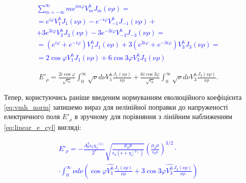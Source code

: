\textcolor{blue} { \begin{equation*} \begin{aligned}
\sum_{m=-\infty}^\infty m e^{im \varphi} V_m^h J_m(\nu \rho) = \\ =
  e^{  i \varphi} V_{ 1}^h J_{ 1}(\nu \rho) - 
  e^{- i \varphi} V_{-1}^h J_{-1}(\nu \rho) + \\ +
3 e^{ 3i \varphi} V_{ 3}^h J_{ 3}(\nu \rho) - 
3 e^{-3i \varphi} V_{-3}^h J_{-3}(\nu \rho) = \\ =
\left( e^{ i\varphi} + e^{- i\varphi} \right) V_1^h J_1(\nu \rho) + 
3 \left( e^{3i\varphi} + e^{-3i\varphi} \right) V_3^h J_3(\nu \rho) = \\
= 2 \cos \varphi V_1^h J_1(\nu \rho) + 
6 \cos 3 \varphi V_3^h J_3(\nu \rho)
\end{aligned} \end{equation*} }

\begin{equation} \begin{aligned}
E'_\rho = \frac{2 i \cos \varphi}{\sqrt{\epsilon_0}}
\int_0^\infty \sqrt{\nu} d \nu V_1^h \frac{J_1(\nu \rho)}{\nu \rho} +
\frac{6 i \cos 3 \varphi}{\sqrt{\epsilon_0}}
\int_0^\infty \sqrt{\nu} d \nu V_3^h \frac{J_3(\nu \rho)}{\nu \rho}.
\end{aligned} \end{equation}

Тепер, користуючись раніше введеним нормуванням еволюційного коефіцієнта 
\eqref{eq:vmh_norm} запишемо вираз для нелінійної поправки до напруженості 
електричного поля $ E'_\rho $ в зручному для порівняння з лінійним наближенням
\eqref{eq:linear_e_cyl} вигляді:

\textcolor{blue} { \begin{equation*} \begin{aligned}
E'_\rho = - \frac{A_0^3 \epsilon_0 \chi_e^{(3)}}{2^7}
\sqrt{\frac{\mu_0 \mu}{\epsilon_0 \left( \epsilon + \chi_e^{(3)} \right)}} 
\left( \frac{\mu_0 \mu}{\epsilon_0 \epsilon} \right)^{3/2} \cdot \\
\cdot \int_0^\infty \nu d \nu \left(
\cos \varphi \hat{V_1^h} \frac{J_1(\nu \rho)}{\nu \rho} +
3 \cos 3\varphi \hat{V_3^h} \frac{J_3(\nu \rho)}{\nu \rho} 
\right)
\end{aligned} \end{equation*} }

